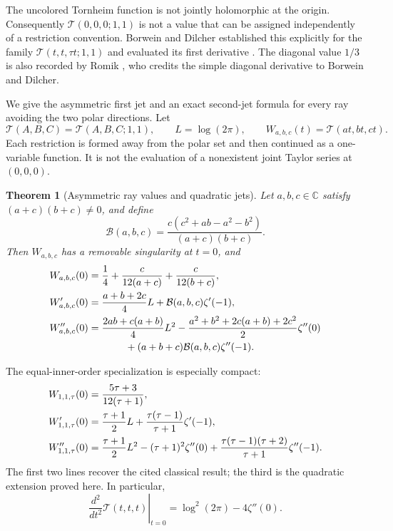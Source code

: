 \documentclass[11pt,a4paper]{article}
\newtheorem{theorem}{Theorem}[section]
\theoremstyle{definition}
\theoremstyle{remark}
\numberwithin{equation}{section}
\begin{document}
The uncolored Tornheim function is not jointly holomorphic at the
origin.  Consequently $\mathcal T(0,0,0;1,1)$ is not a value that can
be assigned independently of a restriction convention.  Borwein and
Dilcher established this explicitly for the family
$\mathcal T(t,t,\tau t;1,1)$ and evaluated its first derivative
\cite[Theorems 2.7 and 3.1]{BorweinDilcher}.  The diagonal value $1/3$ is also
recorded by Romik \cite[Theorem 1.3]{sp:Romik}, who credits the simple
diagonal derivative to Borwein and Dilcher.

We give the asymmetric first jet and an exact second-jet formula for
every ray avoiding the two polar directions.  Let
\[
 \mathcal T(A,B,C)=\mathcal T(A,B,C;1,1),\qquad L=\log(2\pi),
 \qquad W_{a,b,c}(t)=\mathcal T(at,bt,ct).
\]
Each restriction is formed away from the polar set and then continued
as a one-variable function.  It is not the evaluation of a nonexistent
joint Taylor series at $(0,0,0)$.

\begin{theorem}[Asymmetric ray values and quadratic jets]
\label{sp:raytheorem}
Let $a,b,c\in\mathbb C$ satisfy $(a+c)(b+c)\ne0$, and define
\begin{equation}\label{sp:rayB}
 \mathcal B(a,b,c)
 =\frac{c(c^2+ab-a^2-b^2)}{(a+c)(b+c)}.
\end{equation}
Then $W_{a,b,c}$ has a removable singularity at $t=0$, and
\begin{align}
 W_{a,b,c}(0)
   &=\frac14+\frac{c}{12(a+c)}+\frac{c}{12(b+c)},
       \label{sp:ray0}\\
 W_{a,b,c}'(0)
   &=\frac{a+b+2c}{4}L+\mathcal B(a,b,c)\zeta'(-1),
       \label{sp:ray1}\\
 W_{a,b,c}''(0)
   &=\frac{2ab+c(a+b)}4L^2
      -\frac{a^2+b^2+2c(a+b)+2c^2}{2}\zeta''(0)\notag\\
   &\hspace{13mm}+(a+b+c)\mathcal B(a,b,c)\zeta''(-1).
       \label{sp:ray2}
\end{align}
\end{theorem}

The equal-inner-order specialization is especially compact:
\begin{align}
 W_{1,1,\tau}(0)&=\frac{5\tau+3}{12(\tau+1)},\notag\\
 W_{1,1,\tau}'(0)&=\frac{\tau+1}{2}L
             +\frac{\tau(\tau-1)}{\tau+1}\zeta'(-1),\notag\\
 W_{1,1,\tau}''(0)&=\frac{\tau+1}{2}L^2
             -(\tau+1)^2\zeta''(0)
             +\frac{\tau(\tau-1)(\tau+2)}{\tau+1}\zeta''(-1).
 \label{sp:equalray}
\end{align}
The first two lines recover the cited classical result; the third is
the quadratic extension proved here.  In particular,
\begin{equation}\label{sp:diagonal2}
 \left.\frac{d^2}{dt^2}\mathcal T(t,t,t)\right|_{t=0}
    =\log^2(2\pi)-4\zeta''(0).
\end{equation}
\end{document}
